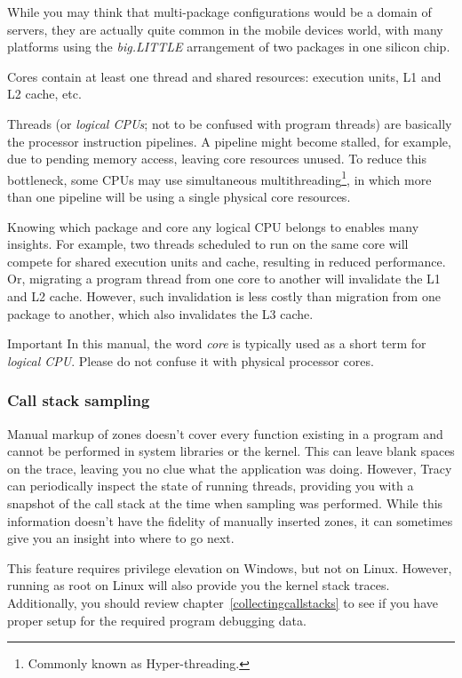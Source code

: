 \documentclass[hidelinks,titlepage,a4paper,twoside]{article}
\begin{document}
While you may think that multi-package configurations would be a domain of servers, they are actually quite common in the mobile devices world, with many platforms using the \emph{big.LITTLE} arrangement of two packages in one silicon chip.

Cores contain at least one thread and shared resources: execution units, L1 and L2 cache, etc.

Threads (or \emph{logical CPUs}; not to be confused with program threads) are basically the processor instruction pipelines. A pipeline might become stalled, for example, due to pending memory access, leaving core resources unused. To reduce this bottleneck, some CPUs may use simultaneous multithreading\footnote{Commonly known as Hyper-threading.}, in which more than one pipeline will be using a single physical core resources.

Knowing which package and core any logical CPU belongs to enables many insights. For example, two threads scheduled to run on the same core will compete for shared execution units and cache, resulting in reduced performance. Or, migrating a program thread from one core to another will invalidate the L1 and L2 cache. However, such invalidation is less costly than migration from one package to another, which also invalidates the L3 cache.

\begin{bclogo}[
noborder=true,
couleur=black!5,
logo=\bcbombe
]{Important}
In this manual, the word \emph{core} is typically used as a short term for \emph{logical CPU}. Please do not confuse it with physical processor cores.
\end{bclogo}

\subsubsection{Call stack sampling}
\label{sampling}

Manual markup of zones doesn't cover every function existing in a program and cannot be performed in system libraries or the kernel. This can leave blank spaces on the trace, leaving you no clue what the application was doing. However, Tracy can periodically inspect the state of running threads, providing you with a snapshot of the call stack at the time when sampling was performed. While this information doesn't have the fidelity of manually inserted zones, it can sometimes give you an insight into where to go next.

This feature requires privilege elevation on Windows, but not on Linux. However, running as root on Linux will also provide you the kernel stack traces. Additionally, you should review chapter~\ref{collectingcallstacks} to see if you have proper setup for the required program debugging data.
\end{document}

